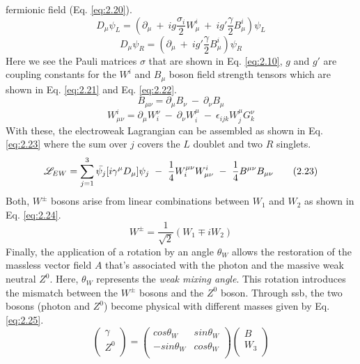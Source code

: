 fermionic field (Eq. \ref{eq:2.20}).
%
\begin{equation}\label{eq:2.19}
    D_{\mu}\psi_{L}=(\partial_{\mu} \ + \ ig\frac{\sigma_{i}}2W_{\mu}^{i} \ + \ ig'\frac{\gamma}2B_{\mu}^{i})\psi_{L}
\tag{2.19}
\end{equation}
%
\begin{equation}\label{eq:2.20}
    D_{\mu}\psi_{R}=(\partial_{\mu} \ + \  ig'\frac{\gamma}2B_{\mu}^{i})\psi_{R}
\tag{2.20}
\end{equation}
%
Here we see the Pauli matrices $\sigma$ that are shown in Eq. \ref{eq:2.10}, $g$ and $g'$ are coupling constants for 
the $W^{i}$ and $B_{\mu}$ boson field strength tensors which are shown in Eq. \ref{eq:2.21} and Eq. \ref{eq:2.22}.
%
\begin{equation}\label{eq:2.21}
    B_{\mu\nu} = \partial_{\mu}B_{\nu} \ - \ \partial_{\nu}B_{\mu}
\tag{2.21}
\end{equation}
%
\begin{equation}\label{eq:2.22}
    W^{i}_{\mu\nu} = \partial_{\mu}W^{\nu}_{i} \ - \ \partial_{\nu}W^{\mu}_{i} \ - \ \epsilon_{ijk} W^{\mu}_{j}G^{\nu}_{k}
\tag{2.22}
\end{equation}
%
With these, the electroweak Lagrangian can be assembled as shown in Eq. \ref{eq:2.23} where the sum over $j$ covers the $L$
doublet and two $R$ singlets.
%
\begin{equation}\label{eq:2.23}
    \Lagr_{EW} =  \sum_{j=1}^{3}\bar{\psi_{j}}[i\gamma^{\mu}D_{\mu}]\psi_{j} \ - \ \frac{1}4W_{i}^{\mu\nu}W_{\mu\nu}^{i} \ - \ \frac{1}4B^{\mu\nu}B_{\mu\nu}  
\tag{2.23}
\end{equation}
%
Both, $W^{\pm}$ bosons arise from linear combinations between $W_{1}$ and $W_{2}$ as shown in Eq. \ref{eq:2.24}.
%
\begin{equation}\label{eq:2.24}
    W^{\pm} = \frac{1}{\sqrt{2}}(W_{1} \mp iW_{2})
\tag{2.24}
\end{equation}
%
Finally, the application of a rotation by an angle $\theta_{W}$ allows the restoration of the massless vector field $A$ that's 
associated with the photon and the massive weak neutral $Z^{0}$. Here, $\theta_{W}$ represents the \textit{weak mixing angle}. This 
rotation introduces the mismatch between the $W^{\pm}$ bosons and the $Z^{0}$ boson. Through \gls{ssb}, the two bosons (photon and $Z^{0}$)
become physical with different masses given by Eq. \ref{eq:2.25}.
%
\begin{equation}\label{eq:2.25}
    \begin{pmatrix}
        \gamma \\
        Z^{0} \\
    \end{pmatrix}
    =
    \begin{pmatrix}
        cos\theta_{W} & sin\theta_{W} \\ 
        -sin\theta_{W} & cos\theta_{W} \\
    \end{pmatrix}
    \begin{pmatrix}
        B \\
        W_{3} \\
    \end{pmatrix}
\tag{2.25}
\end{equation}
